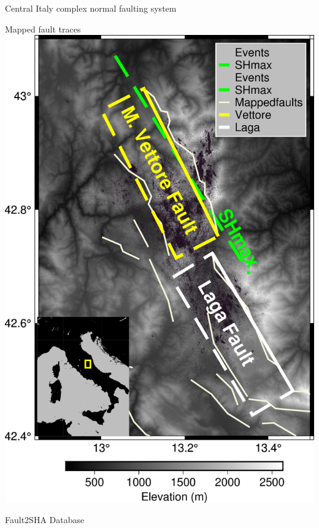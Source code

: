 \documentclass{beamer}
\begin{document}
\begin{frame}
  {Central Italy complex normal faulting system}

  \begin{minipage}{0.4\linewidth}
  \begin{center}
   \vskip 0.2cm Mapped fault traces \\
   \vskip 0.3cm
   \includegraphics[width=1\linewidth]{images/map_italy.png}
  \end{center}
  \vskip -0.2cm \tiny Fault2SHA Database \citep{Walker_2021_FAULT2SHA}
 \end{minipage} \
 \begin{minipage}{0.57\linewidth}
  \begin{center}

\end{center}
\end{minipage}
\end{frame}
\end{document}
